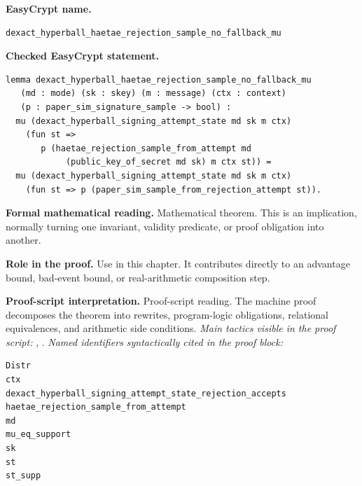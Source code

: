 \begin{formaltheorem}
\noindent\textbf{EasyCrypt name.}
\begin{lstlisting}[language=EasyCrypt,basicstyle=\ttfamily\scriptsize]
dexact_hyperball_haetae_rejection_sample_no_fallback_mu
\end{lstlisting}
\noindent\textbf{Checked EasyCrypt statement.}
\begin{lstlisting}[language=EasyCrypt,basicstyle=\ttfamily\scriptsize]
lemma dexact_hyperball_haetae_rejection_sample_no_fallback_mu
   (md : mode) (sk : skey) (m : message) (ctx : context)
   (p : paper_sim_signature_sample -> bool) :
  mu (dexact_hyperball_signing_attempt_state md sk m ctx)
    (fun st =>
       p (haetae_rejection_sample_from_attempt md
            (public_key_of_secret md sk) m ctx st)) =
  mu (dexact_hyperball_signing_attempt_state md sk m ctx)
    (fun st => p (paper_sim_sample_from_rejection_attempt st)).
\end{lstlisting}
\noindent\textbf{Formal mathematical reading.}
Mathematical theorem. This is an implication, normally turning one invariant, validity predicate, or proof obligation into another.

\noindent\textbf{Role in the proof.}
Use in this chapter. It contributes directly to an advantage bound, bad-event bound, or real-arithmetic composition step.

\noindent\textbf{Proof-script interpretation.}
Proof-script reading. The machine proof decomposes the theorem into rewrites, program-logic obligations, relational equivalences, and arithmetic side conditions.
\emph{Main tactics visible in the proof script:} , .
\emph{Named identifiers syntactically cited in the proof block:}
\begin{lstlisting}[language=EasyCrypt,basicstyle=\ttfamily\scriptsize]
Distr
ctx
dexact_hyperball_signing_attempt_state_rejection_accepts
haetae_rejection_sample_from_attempt
md
mu_eq_support
sk
st
st_supp
\end{lstlisting}

\end{formaltheorem}

